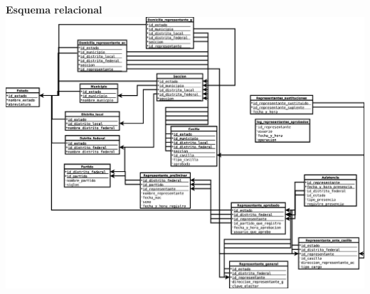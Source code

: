 \documentclass[a4paper,twoside,11pt]{article}
\begin{document}
\newpage
\textbf{Esquema relacional}\\
\includegraphics[scale=0.25]{esquema_relacional}
\end{document}

